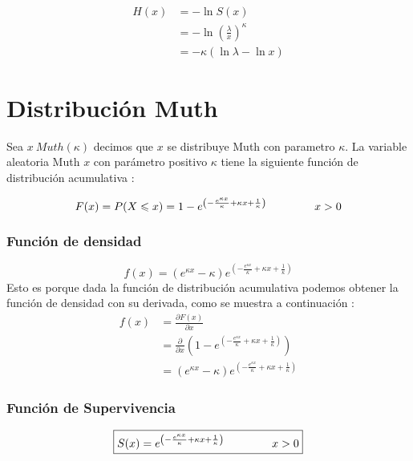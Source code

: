 \documentclass[10pt,a4paper]{article}
\begin{document}
\begin{align*}
H(x) &= -\ln S(x) \\
     &= - \ln \left( \frac{\lambda}{x} \right) ^ \kappa \\
     &= -\kappa (\ln \lambda - \ln x)
\end{align*}

\section{Distribuci\'on Muth}
Sea $ x ~ Muth(\kappa) $ decimos que $x$ se distribuye Muth con parametro $\kappa$. La variable aleatoria Muth $x$ con parámetro positivo $\kappa$ tiene la siguiente función de distribución acumulativa :

\begin{equation*}
	F(x) = P(X \leqslant x) = 1 -  e^{\left(-\frac{e^{\kappa x}}{\kappa} + \kappa x + \frac{1}{\kappa} \right) } \hspace{1.5cm} x>0
\end{equation*}

\subsubsection*{Funci\'on de densidad}

\begin{equation*}
\boxed{
f(x) =  \left( e^{\kappa x} - \kappa \right) e^{\left(-\frac{e^{\kappa x}}{\kappa} + \kappa x + \frac{1}{\kappa} \right) }}
\end{equation*}
Esto es porque dada la función de distribución acumulativa podemos obtener la función de densidad con su derivada, como se muestra a continuación : 
\begin{align*}
f(x) &= \frac{\partial F(x)}{\partial x}	 \\
	&=	\frac{\partial}{\partial x} \left(1 - e^{\left(-\frac{e^{\kappa x}}{\kappa} + \kappa x + \frac{1}{\kappa} \right) } \right)\\
	&= \left( e^{\kappa x} - \kappa \right) e^{\left(-\frac{e^{\kappa x}}{\kappa} + \kappa x + \frac{1}{\kappa} \right) } 
\end{align*} 

\subsubsection*{Funci\'on de Supervivencia}
\begin{equation*}
\boxed{
S(x) =e^{\left(-\frac{e^{\kappa x}}{\kappa} + \kappa x + \frac{1}{\kappa} \right) } \hspace{1.5cm} x > 0}
\end{equation*}
\end{document}
